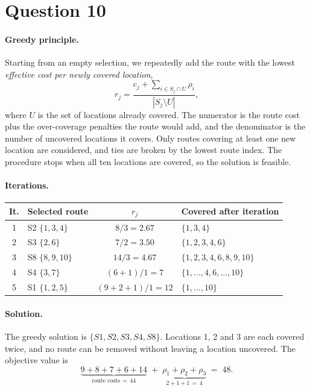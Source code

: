 \section*{Question 10}

\paragraph{Greedy principle.}
Starting from an empty selection, we repeatedly add the route with the
lowest \emph{effective cost per newly covered location},
\[
r_j = \frac{c_j + \sum_{i \in S_j \cap U} \rho_i}{|S_j \setminus U|},
\]
where $U$ is the set of locations already covered. The numerator is the route
cost plus the over-coverage penalties the route would add, and the
denominator is the number of uncovered locations it covers. Only routes
covering at least one new location are considered, and ties are broken by
the lowest route index. The procedure stops when all ten locations are
covered, so the solution is feasible.

\paragraph{Iterations.}
\begin{center}
\begin{tabular}{@{}clcl@{}}
\toprule
It. & Selected route & $r_j$ & Covered after iteration \\
\midrule
1 & S2 $\{1,3,4\}$  & $8/3 = 2.67$          & $\{1,3,4\}$ \\
2 & S3 $\{2,6\}$    & $7/2 = 3.50$          & $\{1,2,3,4,6\}$ \\
3 & S8 $\{8,9,10\}$ & $14/3 = 4.67$         & $\{1,2,3,4,6,8,9,10\}$ \\
4 & S4 $\{3,7\}$    & $(6+1)/1 = 7$         & $\{1,\dots,4,6,\dots,10\}$ \\
5 & S1 $\{1,2,5\}$  & $(9+2+1)/1 = 12$      & $\{1,\dots,10\}$ \\
\bottomrule
\end{tabular}
\end{center}

\paragraph{Solution.}
The greedy solution is $\{S1, S2, S3, S4, S8\}$. Locations 1, 2 and 3 are
each covered twice, and no route can be removed without leaving a location
uncovered. The objective value is
\[
\underbrace{9 + 8 + 7 + 6 + 14}_{\text{route costs} \,=\, 44}
\;+\;
\underbrace{\rho_1 + \rho_2 + \rho_3}_{2+1+1 \,=\, 4}
\;=\; 48 .
\]

